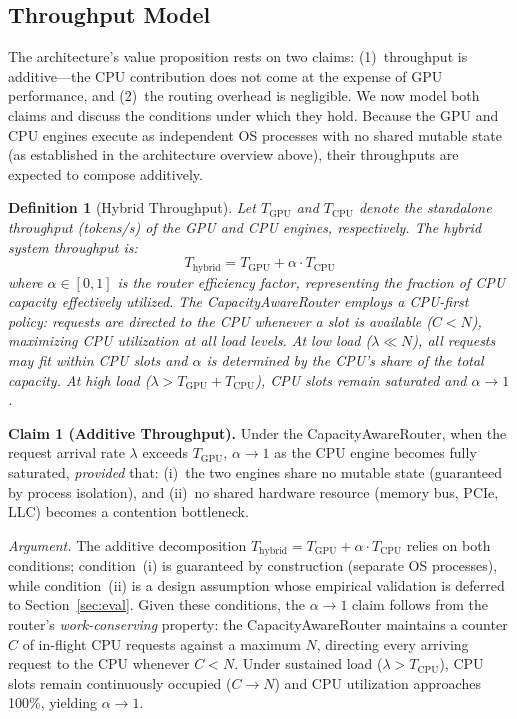 \documentclass[10pt,conference]{IEEEtran}
\newtheorem{definition}[theorem]{Definition}
\begin{document}
\subsection{Throughput Model}
\label{sec:throughput-model}

The architecture's value proposition rests on two claims: (1)~throughput is additive---the CPU contribution does not come at the expense of GPU performance, and (2)~the routing overhead is negligible.
We now model both claims and discuss the conditions under which they hold.
Because the GPU and CPU engines execute as independent OS processes with no shared mutable state (as established in the architecture overview above), their throughputs are expected to compose additively.

\begin{definition}[Hybrid Throughput]
\label{def:throughput}
Let $T_\text{GPU}$ and $T_\text{CPU}$ denote the standalone throughput (tokens/s) of the GPU and CPU engines, respectively. The hybrid system throughput is:
\begin{equation}
T_\text{hybrid} = T_\text{GPU} + \alpha \cdot T_\text{CPU}
\end{equation}
where $\alpha \in [0, 1]$ is the \emph{router efficiency factor}, representing the fraction of CPU capacity effectively utilized.
The CapacityAwareRouter employs a \emph{CPU-first} policy: requests are directed to the CPU whenever a slot is available ($C < N$), maximizing CPU utilization at all load levels.
At low load ($\lambda \ll N$), all requests may fit within CPU slots and $\alpha$ is determined by the CPU's share of the total capacity.
At high load ($\lambda > T_\text{GPU} + T_\text{CPU}$), CPU slots remain saturated and $\alpha \to 1$.
\end{definition}

\textbf{Claim 1 (Additive Throughput).}
\label{thm:additive}
Under the CapacityAwareRouter, when the request arrival rate $\lambda$ exceeds $T_\text{GPU}$, $\alpha \to 1$ as the CPU engine becomes fully saturated, \emph{provided} that: (i)~the two engines share no mutable state (guaranteed by process isolation), and (ii)~no shared hardware resource (memory bus, PCIe, LLC) becomes a contention bottleneck.

\emph{Argument.}
The additive decomposition $T_\text{hybrid} = T_\text{GPU} + \alpha \cdot T_\text{CPU}$ relies on both conditions; condition~(i) is guaranteed by construction (separate OS processes), while condition~(ii) is a design assumption whose empirical validation is deferred to Section~\ref{sec:eval}.
Given these conditions, the $\alpha \to 1$ claim follows from the router's \emph{work-conserving} property: the CapacityAwareRouter maintains a counter $C$ of in-flight CPU requests against a maximum $N$, directing every arriving request to the CPU whenever $C < N$.
Under sustained load ($\lambda > T_\text{CPU}$), CPU slots remain continuously occupied ($C \to N$) and CPU utilization approaches 100\%, yielding $\alpha \to 1$.
\end{document}
